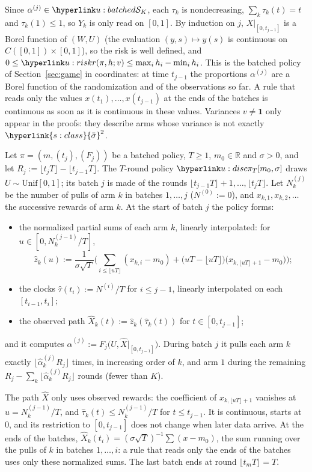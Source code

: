 \documentclass[11pt]{article}
\newcommand{\dt}[1]{\hypertarget{#1}{}}
\DeclareRobustCommand{\sy}[2]{{\hyperlink{#1}{#2}}}
\newcommand{\R}{\mathbb{R}}
\newcommand{\1}{\mathbf{1}}
\newcommand{\sbar}{\sy{s:class}{\bar\sigma}}
\begin{document}
\noindent Since $\alpha^{(j)}\in\uSimp$, each $\tau_k$ is nondecreasing, $\sum_k\tau_k(t)=t$ and $\tau_k(1)\le1$, so $Y_k$ is only read on $[0,1]$. By
induction on $j$, $X|_{[0,t_{j-1}]}$ is a Borel function of $(W,U)$ (the evaluation $(y,s)\mapsto y(s)$ is continuous on $C([0,1])\times[0,1]$), so the risk is
well defined, and $0\le\urk(\pi,h;v)\le\max_ih_i-\min_ih_i$. This is the batched policy of Section~\ref{sec:game} in coordinates: at time $t_{j-1}$ the
proportions $\alpha^{(j)}$ are a Borel function of the randomization and of the observations so far. A rule that reads only the values $x(t_1),\dots,x(t_{j-1})$
at the ends of the batches is continuous as soon as it is continuous in these values. Variances $v\ne\mathbf 1$ only appear in the proofs: they describe arms whose
variance is not exactly $\sbar^2$.

\begin{definition}[discretization]\label{def:u-disc}\dt{u:disc}
Let $\pi=(m,(t_j),(F_j))$ be a batched policy, $T\ge1$, $m_0\in\R$ and $\sigma>0$, and let $R_j:=\lfloor t_jT\rfloor-\lfloor t_{j-1}T\rfloor$. The $T$-round
policy $\uDisc{\pi}{T}{m_0,\sigma}$ draws $U\sim\mathrm{Unif}[0,1]$; its batch $j$ is made of the rounds $\lfloor t_{j-1}T\rfloor+1,\dots,\lfloor t_jT\rfloor$. Let
$N^{(j)}_k$ be the number of pulls of arm $k$ in batches $1,\dots,j$ ($N^{(0)}:=0$), and $x_{k,1},x_{k,2},\dots$ the successive rewards of arm $k$. At the start
of batch $j$ the policy forms:
\begin{itemize}
\item the normalized partial sums of each arm $k$, linearly interpolated: for $u\in[0,N^{(j-1)}_k/T]$,
\[
\hat z_k(u):=\frac1{\sigma\sqrt T}\Big(\sum_{i\le\lfloor uT\rfloor}(x_{k,i}-m_0)+\big(uT-\lfloor uT\rfloor\big)\big(x_{k,\lfloor uT\rfloor+1}-m_0\big)\Big);
\]
\item the clocks $\hat\tau(t_i):=N^{(i)}/T$ for $i\le j-1$, linearly interpolated on each $[t_{i-1},t_i]$;
\item the observed path $\hat X_k(t):=\hat z_k(\hat\tau_k(t))$ for $t\in[0,t_{j-1}]$;
\end{itemize}
and it computes $\hat\alpha^{(j)}:=F_j\big(U,\hat X|_{[0,t_{j-1}]}\big)$. During batch $j$ it pulls each arm $k$ exactly $\lfloor\hat\alpha^{(j)}_kR_j\rfloor$ times,
in increasing order of $k$, and arm $1$ during the remaining $R_j-\sum_k\lfloor\hat\alpha^{(j)}_kR_j\rfloor$ rounds (fewer than $K$).
\end{definition}

\noindent The path $\hat X$ only uses observed rewards: the coefficient of $x_{k,\lfloor uT\rfloor+1}$ vanishes at $u=N^{(j-1)}_k/T$, and
$\hat\tau_k(t)\le N^{(j-1)}_k/T$ for $t\le t_{j-1}$. It is continuous, starts at $0$, and its restriction to $[0,t_{j-1}]$ does not change when later data
arrive. At the ends of the batches, $\hat X_k(t_i)=(\sigma\sqrt T)^{-1}\sum(x-m_0)$, the sum running over the pulls of $k$ in batches $1,\dots,i$: a rule that
reads only the ends of the batches uses only these normalized sums. The last batch ends at round $\lfloor t_mT\rfloor=T$.
\end{document}
